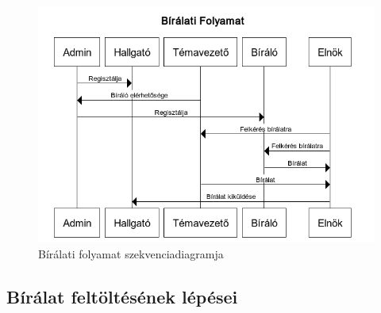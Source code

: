 \newpage

\begin{figure}[h]
\centering
\includegraphics[scale=0.8]{images/Bírálati_folyamat.png}
\caption{Bírálati folyamat szekvenciadiagramja}
\label{fig:biralati_folyamat}
\end{figure}

\subsection{Bírálat feltöltésének lépései}

